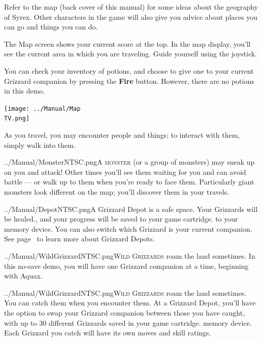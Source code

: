 \documentclass[10pt,twocolumn,openany,article]{memoir}
\newcommand\TV{NTSC}
\newcommand\TV{PAL}
\newcommand\TV{SECAM}
\begin{document}
Refer to the  map (back cover of  this manual) for some  ideas about the
geography of  Syrex. Other  characters in  the game  will also  give you
advice about places you can go and things you can do.

The Map screen shows your current score  at the top. In the map display,
you'll see the  current area in which you are  traveling. Guide yourself
using the joystick.

You can check your inventory of potions,  and choose to give one to your
current  Grizzard  companion  by   pressing  the  \textbf{Fire}  button.
\ifdefined\DEMO However, there are no potions in this demo. \fi

\begin{center}
  \texttt{[image: ../Manual/Map\\TV.png]}
\end{center}

As you  travel, you may  encounter people  and things; to  interact with
them, simply walk into them.

\lettrine[image=true,                lines=5,               findent=3pt,
nindent=3pt]{../Manual/Monster\TV.png}{A   monster}  (or   a  group   of
monsters) may  sneak up on you  and attack! Other times  you'll see them
waiting for you and can avoid battle  --- or walk up to them when you're
ready to  face them. Particularly  giant monsters look different  on the
map; you'll discover them in your travels.

\lettrine[image=true,                lines=5,               findent=3pt,
nindent=3pt]{../Manual/Depot\TV.png}{A} Grizzard Depot  is a safe space.
Your  Grizzards will  be  healed\ifdefined\NOSAVE{}.{}\else{}, and  your
progress will  be saved \ifdefined\ATARIAGESAVE to  your game cartridge.
\else to your  memory device. \fi You can also  switch which Grizzard is
your  current  companion.  \fi See  page~\pageref{sec:GrizzardDepot}  to
learn more about Grizzard Depots.

\ifdefined\NOSAVE

\lettrine[image=true,                lines=5,               findent=3pt,
nindent=3pt]{../Manual/WildGrizzard\TV.png}{Wild  Grizzards}   roam  the
land sometimes. In this no-save demo, you will have one Grizzard companion at a time,
beginning with  Aquax.

\else

\lettrine[image=true,                lines=5,               findent=3pt,
nindent=3pt]{../Manual/WildGrizzard\TV.png}{Wild  Grizzards}   roam  the
land  sometimes.   You  can   catch  them   when  you   encounter  them.
At  a Grizzard  Depot,  you'll have  the option  to  swap your  Grizzard
companion  between  those you  have  caught,  with  up to  30  different
Grizzards saved  in your  \ifdefined\ATARIAGESAVE game  cartridge. \else
memory device. \fi Each Grizzard you catch will have its own moves and
skill ratings. 
\end{document}
